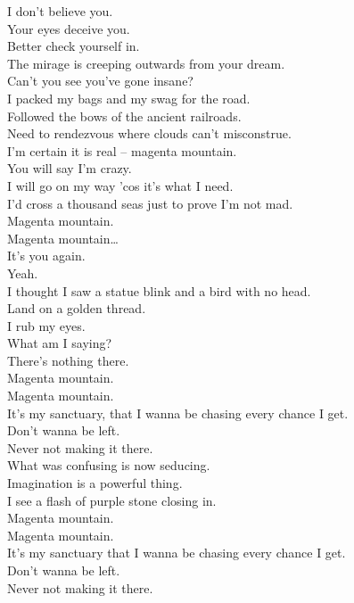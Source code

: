 I don't believe you. \\
Your eyes deceive you. \\
Better check yourself in. \\
The mirage is creeping outwards from your dream. \\
Can't you see you've gone insane? \\

I packed my bags and my swag for the road. \\
Followed the bows of the ancient railroads. \\
Need to rendezvous where clouds can't misconstrue. \\
I'm certain it is real -- magenta mountain. \\

You will say I'm crazy. \\
I will go on my way 'cos it's what I need. \\
I'd cross a thousand seas just to prove I'm not mad. \\
Magenta mountain. \\

Magenta mountain… \\

It's you again. \\
Yeah. \\
I thought I saw a statue blink and a bird with no head. \\
Land on a golden thread. \\
I rub my eyes. \\
What am I saying? \\
There's nothing there. \\

Magenta mountain. \\
Magenta mountain. \\
It's my sanctuary, that I wanna be chasing every chance I get. \\
Don't wanna be left. \\
Never not making it there. \\

What was confusing is now seducing. \\
Imagination is a powerful thing. \\
I see a flash of purple stone closing in. \\

Magenta mountain. \\
Magenta mountain. \\
It's my sanctuary that I wanna be chasing every chance I get. \\
Don't wanna be left. \\
Never not making it there. \\

